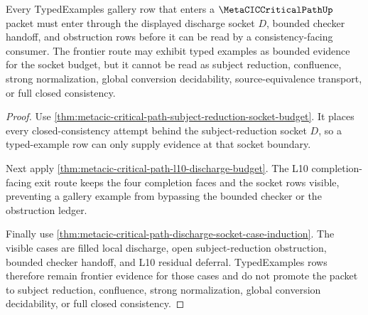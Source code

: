 \begin{theorem}
\label{thm:metacic-critical-path-typed-example-frontier-route}
Every TypedExamples gallery row that enters a $\MetaCICCriticalPathUp$ packet must enter through the displayed discharge socket $D$, bounded checker handoff, and obstruction rows before it can be read by a consistency-facing consumer. The frontier route may exhibit typed examples as bounded evidence for the socket budget, but it cannot be read as subject reduction, confluence, strong normalization, global conversion decidability, source-equivalence transport, or full closed consistency.
\end{theorem}
\begin{proof}
Use \autoref{thm:metacic-critical-path-subject-reduction-socket-budget}. It places every closed-consistency attempt behind the subject-reduction socket $D$, so a typed-example row can only supply evidence at that socket boundary.

Next apply \autoref{thm:metacic-critical-path-l10-discharge-budget}. The L10 completion-facing exit route keeps the four completion faces and the socket rows visible, preventing a gallery example from bypassing the bounded checker or the obstruction ledger.

Finally use \autoref{thm:metacic-critical-path-discharge-socket-case-induction}. The visible cases are filled local discharge, open subject-reduction obstruction, bounded checker handoff, and L10 residual deferral. TypedExamples rows therefore remain frontier evidence for those cases and do not promote the packet to subject reduction, confluence, strong normalization, global conversion decidability, or full closed consistency.
\end{proof}
